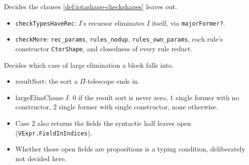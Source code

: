 \begin{example}
  \label{def:iotashape-checkmore}
  \leanok

   Decides the clauses \ref{def:iotashape-checkshapes} leaves out.
  \begin{itemize}
  \item \texttt{checkTypesHaveRec}: $I$'s recursor eliminates $I$ itself, via
        \texttt{majorFormer?}.
  \item \texttt{checkMore}: \texttt{rec\_params}, \texttt{rules\_nodup},
        \texttt{rules\_own\_params}, each rule's constructor \texttt{CtorShape}, and closedness of
        every rule reduct.
  \end{itemize}
\end{example}

\begin{example}
  \label{def:iotashape-largeelim}
  \leanok

   Decides which case of large elimination a block falls into.
  \begin{itemize}
  \item $\mathrm{resultSort}$: the sort a $\Pi$-telescope ends in.
  \item $\mathrm{largeElimClause}\;I$: $0$ if the result sort is never zero, $1$ single former with
        no constructor, $2$ single former with single constructor, $\mathrm{none}$ otherwise.
  \item Case $2$ also returns the fields the syntactic half leaves open
        (\texttt{VExpr.FieldInIndices}).
  \item {} Whether those open fields are propositions is a typing condition,
        deliberately not decided here.
  \end{itemize}
\end{example}

